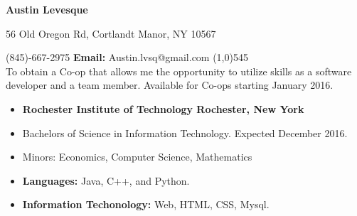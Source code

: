 \documentclass[10pt]{article}
\begin{document}
\centerline{\Large \bf Austin Levesque}
\vspace{.5ex}
\centerline{56 Old Oregon Rd, Cortlandt Manor, NY 10567}
\vspace{1ex}
 (845)-667-2975 \hfill {\bf Email:} Austin.lvsq@gmail.com
\line(1,0){545}\\
To obtain a Co-op that allows me the opportunity to utilize skills as a software developer and a team member. Available for Co-ops starting January 2016.
\vspace{1ex}\\
\begin{itemize}[topsep=1ex, itemsep=.25ex, partopsep=0ex, parsep=0ex]
	\item[]{{\bf Rochester Institute of Technology \hfill Rochester, New York}}
  \item[] Bachelors of Science in Information Technology. \hfill Expected December 2016.
  \item[] Minors: Economics, Computer Science, Mathematics
\end{itemize}
\vspace{1ex}
\begin{itemize} [topsep=1ex, itemsep=.25ex, partopsep=0ex, parsep=1ex]
	\item[] {\bf Languages:} Java, C++, and Python.
 	\item[] {\bf Information Techonology:} Web, HTML, CSS, Mysql.
\end{itemize}
\vspace{1ex}
\end{document}
